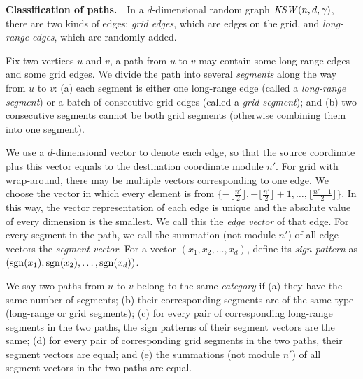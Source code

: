 \documentclass[11pt]{article}
\def\KSW{{\it KSW }}
\def\sgn{\mathop{\rm sgn}}
\begin{document}
\vspace{\topsep}
\noindent
{\bf Classification of paths.}\ \ 
In a $d$-dimensional random graph $\KSW(n,d,\gamma)$, 
	there are two kinds of edges: {\em grid edges}, which are 
	edges on the grid, and {\em long-range edges}, which are randomly added. 


Fix two vertices $u$ and $v$, a path from $u$ to $v$ may contain some 
	long-range edges and some grid edges. 
We divide the path into several {\em segments} along the way from $u$ to $v$:
	(a) each segment is either one long-range edge (called a {\em long-range
	segment}) or a batch of consecutive 
	grid edges (called a {\em grid segment}); and
	(b) two consecutive segments  cannot be both grid segments
	(otherwise combining them into one segment).

We use a $d$-dimensional vector to denote each edge, so that the source coordinate plus this vector equals to the destination coordinate module $n'$. For grid with wrap-around, there may be multiple vectors corresponding to one edge. We choose the vector in which every element is from 
	$\{-\lfloor\frac{n'}{2}\rfloor,-\lfloor\frac{n'}{2}\rfloor+1,
	\ldots,\lfloor\frac{n'-1}{2}\rfloor\}$.
In this way, the vector representation of each edge is unique and the absolute value of every dimension is the smallest. We call this the {\em edge vector} of that edge. For every segment in the path, we call the summation (not module $n'$) of all edge vectors the {\em segment vector}. 
For a vector $(x_1,x_2,\ldots,x_d)$, define its {\em sign pattern} as $(\sgn(x_1), \sgn(x_2), \ldots, \sgn(x_d))$.


We say two paths from $u$ to $v$ belong to the same {\em category} if
	(a) they have the same number of segments; 
	(b) their corresponding segments are of the same type (long-range
	or grid segments); 
	(c) for every pair of corresponding long-range segments in the two paths, 
	the sign patterns of their segment vectors are the same;
	(d) for every pair of corresponding grid segments in the two paths,
	their segment vectors are equal; and
	(e) the summations (not module $n'$) of all segment vectors in the 
	two paths are equal.
\end{document}
